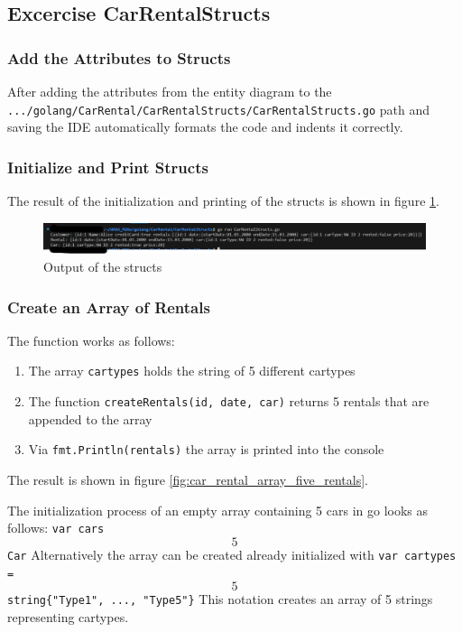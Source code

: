 \subsection{Excercise CarRentalStructs}
\label{sec:car_rental_structs}

\subsubsection*{Add the Attributes to Structs}
After adding the attributes from the entity diagram to the 
\texttt{.../golang/CarRental/CarRentalStructs/CarRentalStructs.go} path and saving
the IDE automatically formats the code and indents it correctly.

\subsubsection*{Initialize and Print Structs}
The result of the initialization and printing of the structs is shown in figure \ref{fig:car_rental_structs}.
\begin{figure}[H]
    \centering
    \includegraphics[width=\textwidth]{figures/goLang/carRental/carRental_structs.png}
    \caption{Output of the structs}
    \label{fig:car_rental_structs}
\end{figure}

\subsubsection*{Create an Array of Rentals}
The function works as follows:
\begin{enumerate}
    \item The array \texttt{cartypes} holds the string of 5 different cartypes
    \item The function \texttt{createRentals(id, date, car)} returns 5 rentals that are appended to the array
    \item Via \texttt{fmt.Println(rentals)} the array is printed into the console
\end{enumerate}

The result is shown in figure \ref{fig:car_rental_array_five_rentals}.

The initialization process of an empty array containing 5 cars in go looks as follows: \texttt{var cars \[5\]Car}
Alternatively the array can be created already initialized with \texttt{var cartypes = \[5\]string\{"Type1", ..., "Type5"\}}
This notation creates an array of 5 strings representing cartypes.

